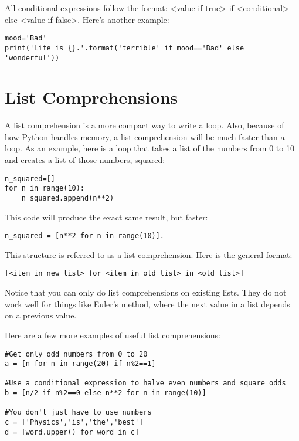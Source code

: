 All conditional expressions follow the format: <value if true> if <conditional> else <value if false>.  Here's another example:
\begin{Verbatim}
mood='Bad'
print('Life is {}.'.format('terrible' if mood=='Bad' else 'wonderful'))
\end{Verbatim}


\section{List Comprehensions}\label{sec:comprehensions}
A list comprehension is a more compact way to write a  loop.  Also, because of how Python handles memory, a list comprehension will be much faster than a  loop.  As an example, here is a  loop that takes a list of the numbers from 0 to 10 and creates a list of those numbers, squared:
\begin{Verbatim}
n_squared=[]
for n in range(10):
    n_squared.append(n**2)

\end{Verbatim}
This code will produce the exact same result, but faster:
\begin{Verbatim}
n_squared = [n**2 for n in range(10)].
\end{Verbatim}
This structure is referred to as a list comprehension. Here is the general format:
\begin{Verbatim}
[<item_in_new_list> for <item_in_old_list> in <old_list>]
\end{Verbatim}
Notice that you can only do list comprehensions on existing lists.  They do not work well for things like Euler's method, where the next value in a list depends on a previous value.

Here are a few more examples of useful list comprehensions:
\begin{Verbatim}
#Get only odd numbers from 0 to 20
a = [n for n in range(20) if n%2==1]

#Use a conditional expression to halve even numbers and square odds
b = [n/2 if n%2==0 else n**2 for n in range(10)]

#You don't just have to use numbers
c = ['Physics','is','the','best']
d = [word.upper() for word in c]
\end{Verbatim}


